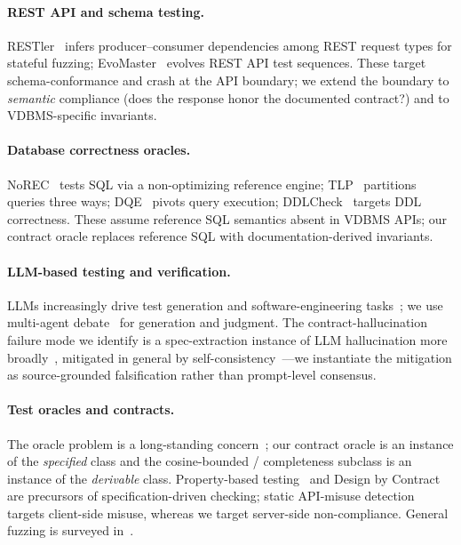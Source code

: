 \documentclass[sigconf]{acmart}
\begin{document}
\paragraph{REST API and schema testing.} RESTler~\cite{restler19} infers producer--consumer dependencies among REST request types for stateful fuzzing; EvoMaster~\cite{evomaster21} evolves REST API test sequences. These target schema-conformance and crash at the API boundary; we extend the boundary to \emph{semantic} compliance (does the response honor the documented contract?) and to VDBMS-specific invariants.
\paragraph{Database correctness oracles.} NoREC~\cite{norec20} tests SQL via a non-optimizing reference engine; TLP~\cite{tlp20} partitions queries three ways; DQE~\cite{dqe20} pivots query execution; DDLCheck~\cite{ddlcheck25} targets DDL correctness. These assume reference SQL semantics absent in VDBMS APIs; our contract oracle replaces reference SQL with documentation-derived invariants.
\paragraph{LLM-based testing and verification.} LLMs increasingly drive test generation and software-engineering tasks~\cite{hou23llmse}; we use multi-agent debate~\cite{du2023improving} for generation and judgment. The contract-hallucination failure mode we identify is a spec-extraction instance of LLM hallucination more broadly~\cite{ji23hall}, mitigated in general by self-consistency~\cite{wang22sc}---we instantiate the mitigation as source-grounded falsification rather than prompt-level consensus.
\paragraph{Test oracles and contracts.} The oracle problem is a long-standing concern~\cite{barr15}; our contract oracle is an instance of the \emph{specified} class and the cosine-bounded / completeness subclass is an instance of the \emph{derivable} class. Property-based testing~\cite{claessen00} and Design by Contract~\cite{meyer92dbc} are precursors of specification-driven checking; static API-misuse detection~\cite{amann19} targets client-side misuse, whereas we target server-side non-compliance. General fuzzing is surveyed in~\cite{manes21}.

\end{document}
